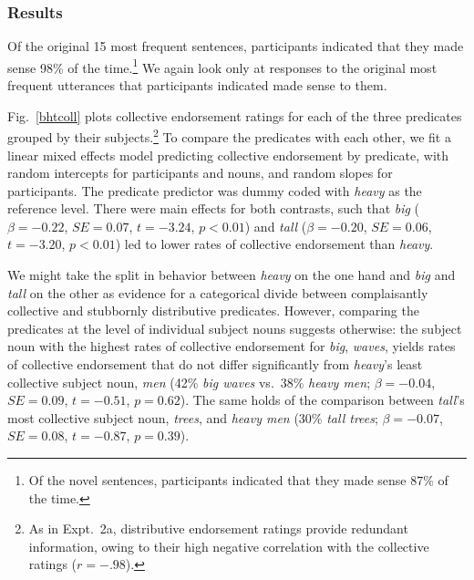 \documentclass[preprint,12pt,authoryear,titlepage]{elsarticle}
\newcommand{\ndg}[1]{\textcolor{Green}{[ndg: #1]}}
\begin{document}
\subsubsection{Results}

Of the original 15 most frequent sentences, participants indicated that they made sense 98\% of the time.\footnote{Of the novel sentences, participants indicated that they made sense 87\% of the time.} 
We again look only at responses to the original most frequent utterances that participants indicated made sense to them.


Fig.~\ref{bhtcoll} plots collective endorsement ratings for each of the three predicates grouped by their subjects.\footnote{As in Expt.~2a, distributive endorsement ratings provide redundant information, owing to their high negative correlation with the collective ratings ($r=-.98$).}
%
%
To compare the predicates with each other, we fit a linear mixed effects model predicting collective endorsement by predicate, with random intercepts for participants and nouns, and random slopes for participants. The predicate predictor was dummy coded with \emph{heavy} as the reference level. There were main effects for both contrasts, such that \emph{big} ($\beta=-0.22$, $SE=0.07$, $t=-3.24$, $p<0.01$) and \emph{tall} ($\beta=-0.20$, $SE=0.06$, $t=-3.20$, $p<0.01$) led to lower rates of collective endorsement than \emph{heavy}. 

We might take the split in behavior between \emph{heavy} on the one hand and \emph{big} and \emph{tall} on the other as evidence for a categorical divide between complaisantly collective and stubbornly distributive predicates. However, comparing the predicates at the level of individual subject nouns suggests otherwise: the subject noun with the highest rates of collective endorsement for \emph{big}, \emph{waves}, yields rates of collective endorsement that do not differ significantly from \emph{heavy}'s least collective subject noun, \emph{men} (42\% \emph{big waves} vs.~38\% \emph{heavy men}; $\beta=-0.04$, $SE=0.09$, $t=-0.51$, $p=0.62$). The same holds of the comparison between \emph{tall}'s most collective subject noun, \emph{trees}, and \emph{heavy men} (30\% \emph{tall trees}; $\beta=-0.07$, $SE=0.08$, $t=-0.87$, $p=0.39$). 
\end{document}

